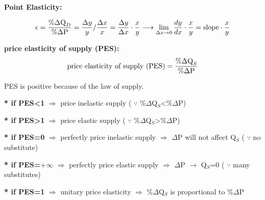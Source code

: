 \documentclass[UTF8]{article}
\begin{document}
\textbf{Point Elasticity: }

\begin{equation}
    \epsilon = {{\%\Delta \text{Q}_D}\over \%\Delta \text{P}} = {\Delta y\over y}/{\Delta x\over x} = {\Delta y\over \Delta x}\cdot{x\over y} \longrightarrow \lim_{\Delta x\rightarrow 0}{dy\over dx}\cdot{x\over y}= \text{slope}\cdot{x\over y}
    \nonumber
\end{equation}

\begin{figure}[!h]
\end{figure}

\newpage
\textbf{price elasticity of supply (PES):}
\begin{equation}
    \text{price elasticity of supply (PES)} = {{\%\Delta \text{Q}_S}\over \%\Delta \text{P}}
    \nonumber
\end{equation}

PES is positive because of the law of supply.

\textbf{* if PES<1 }$\Longrightarrow$ price inelastic supply ( $\because$ \%$\Delta$Q$_S$<\%$\Delta$P) 

\textbf{* if PES>1 }$\Longrightarrow$ price elastic supply ( $\because$ \%$\Delta$Q$_S$>\%$\Delta$P)


\textbf{* if PES=0 }$\Longrightarrow$ perfectly price inelastic supply $\Longrightarrow$ $\Delta$P will not affect Q$_S$ ( $\because$ no substitute)

\textbf{* if PES=$+\infty$ }$\Longrightarrow$ perfectly price elastic supply $\Longrightarrow$ $\Delta$P $\rightarrow$ Q$_S$=0 ( $\because$ many substitutes)

\textbf{* if PES=1 }$\Longrightarrow$ unitary price elasticity $\Longrightarrow$ \%$\Delta$Q$_S$ is proportional to \%$\Delta$P
\end{document}
